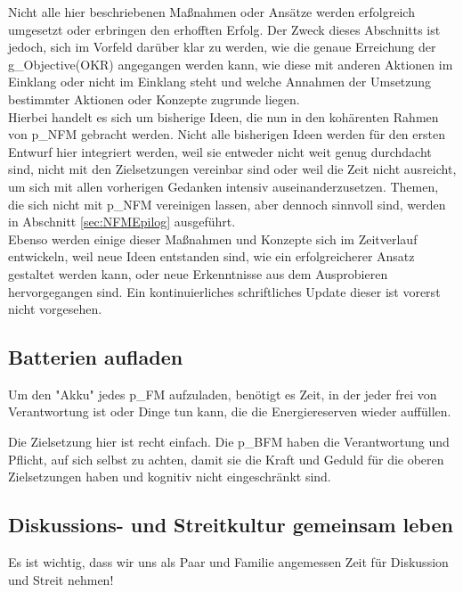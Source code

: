 Nicht alle hier beschriebenen Maßnahmen oder Ansätze werden erfolgreich umgesetzt oder erbringen den erhofften Erfolg. Der Zweck dieses Abschnitts ist jedoch, sich im Vorfeld darüber klar zu werden, wie die genaue Erreichung der \gls{g_Objective(OKR)} angegangen werden kann, wie diese mit anderen Aktionen im Einklang oder nicht im Einklang steht und welche Annahmen der Umsetzung bestimmter Aktionen oder Konzepte zugrunde liegen.\\


Hierbei handelt es sich um bisherige Ideen, die nun in den kohärenten Rahmen von \gls{p_NFM} gebracht werden. Nicht alle bisherigen Ideen werden für den ersten Entwurf hier integriert werden, weil sie entweder nicht weit genug durchdacht sind, nicht mit den Zielsetzungen vereinbar sind oder weil die Zeit nicht ausreicht, um sich mit allen vorherigen Gedanken intensiv auseinanderzusetzen. Themen, die sich nicht mit \gls{p_NFM} vereinigen lassen, aber dennoch sinnvoll sind, werden in Abschnitt \ref{sec:NFMEpilog} ausgeführt.\\

Ebenso werden einige dieser Maßnahmen und Konzepte sich im Zeitverlauf entwickeln, weil neue Ideen entstanden sind, wie ein erfolgreicherer Ansatz gestaltet werden kann, oder neue Erkenntnisse aus dem Ausprobieren hervorgegangen sind. Ein kontinuierliches schriftliches Update dieser ist vorerst nicht vorgesehen.

\subsection{Batterien aufladen}

Um den "Akku" jedes \gls{p_FM} aufzuladen, benötigt es Zeit, in der jeder frei von Verantwortung ist oder Dinge tun kann, die die Energiereserven wieder auffüllen.

Die Zielsetzung hier ist recht einfach. Die \gls{p_BFM} haben die Verantwortung und Pflicht, auf sich selbst zu achten, damit sie die Kraft und Geduld für die oberen Zielsetzungen haben und kognitiv nicht eingeschränkt sind.

\subsection{Diskussions- und Streitkultur gemeinsam leben}\label{subsec_LeitendePrinzipien_Diskussionskultur}

Es ist wichtig, dass wir uns als Paar und Familie angemessen Zeit für Diskussion und Streit nehmen!\\


